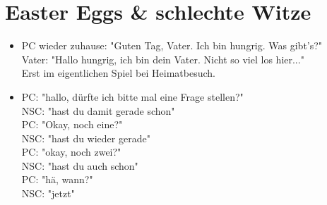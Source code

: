 \section{Easter Eggs \& schlechte Witze}
\begin{itemize}
	\item PC wieder zuhause: "Guten Tag, Vater. Ich bin hungrig. Was gibt's?" \\ Vater: "Hallo hungrig, ich bin dein Vater. Nicht so viel los hier..." \\ Erst im eigentlichen Spiel bei Heimatbesuch.
	\item  PC: "hallo, dürfte ich bitte mal eine Frage stellen?" \\ NSC: "hast du damit gerade schon" \\ PC: "Okay, noch eine?" \\ NSC: "hast  du wieder gerade" \\ PC: "okay, noch zwei?" \\ NSC: "hast du auch schon" \\ PC: "hä, wann?" \\ NSC: "jetzt"
\end{itemize}